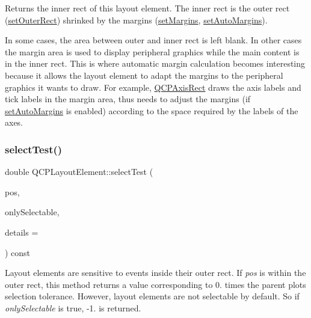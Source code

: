 Returns the inner rect of this layout element. The inner rect is the outer rect (\mbox{\hyperlink{class_q_c_p_layout_element_a38975ea13e36de8e53391ce41d94bc0f}{set\+Outer\+Rect}}) shrinked by the margins (\mbox{\hyperlink{class_q_c_p_layout_element_a8f450b1f3f992ad576fce2c63d8b79cf}{set\+Margins}}, \mbox{\hyperlink{class_q_c_p_layout_element_accfda49994e3e6d51ed14504abf9d27d}{set\+Auto\+Margins}}).

In some cases, the area between outer and inner rect is left blank. In other cases the margin area is used to display peripheral graphics while the main content is in the inner rect. This is where automatic margin calculation becomes interesting because it allows the layout element to adapt the margins to the peripheral graphics it wants to draw. For example, \mbox{\hyperlink{class_q_c_p_axis_rect}{Q\+C\+P\+Axis\+Rect}} draws the axis labels and tick labels in the margin area, thus needs to adjust the margins (if \mbox{\hyperlink{class_q_c_p_layout_element_accfda49994e3e6d51ed14504abf9d27d}{set\+Auto\+Margins}} is enabled) according to the space required by the labels of the axes. \mbox{\label{class_q_c_p_layout_element_ae97f483cccedadbf18ea4525ef240ee4}} 
\subsubsection{\texorpdfstring{select\+Test()}{selectTest()}}
{\footnotesize\ttfamily double Q\+C\+P\+Layout\+Element\+::select\+Test (\begin{DoxyParamCaption}\item[{const Q\+PointF \&}]{pos,  }\item[{bool}]{only\+Selectable,  }\item[{Q\+Variant $\ast$}]{details = {} }\end{DoxyParamCaption}) const\hspace{0.3cm}{\ttfamily [virtual]}}

Layout elements are sensitive to events inside their outer rect. If {\itshape pos} is within the outer rect, this method returns a value corresponding to 0. times the parent plot\textquotesingle{}s selection tolerance. However, layout elements are not selectable by default. So if {\itshape only\+Selectable} is true, -\/1. is returned.

